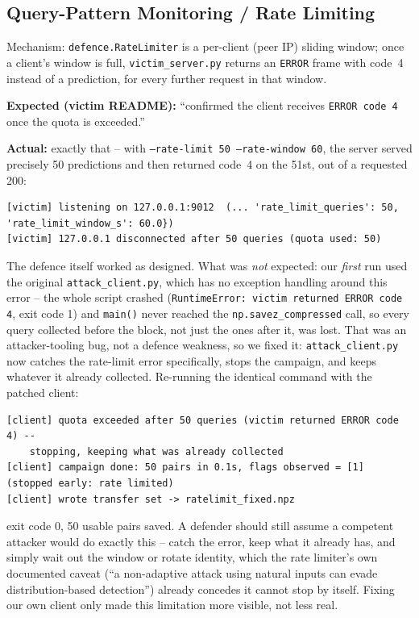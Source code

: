 \documentclass[11pt]{article}
\begin{document}
\subsection{Query-Pattern Monitoring / Rate Limiting}

Mechanism: \texttt{defence.RateLimiter} is a per-client (peer IP) sliding
window; once a client's window is full, \texttt{victim\_server.py} returns
an \texttt{ERROR} frame with code~4 instead of a prediction, for every
further request in that window.

\textbf{Expected (victim README):} ``confirmed the client receives
\texttt{ERROR code 4} once the quota is exceeded.''

\textbf{Actual:} exactly that -- with \texttt{--rate-limit 50 --rate-window 60},
the server served precisely 50 predictions and then returned code~4 on the
51st, out of a requested 200:
\begin{lstlisting}
[victim] listening on 127.0.0.1:9012  (... 'rate_limit_queries': 50, 'rate_limit_window_s': 60.0})
[victim] 127.0.0.1 disconnected after 50 queries (quota used: 50)
\end{lstlisting}
The defence itself worked as designed. What was \emph{not} expected: our
\emph{first} run used the original \texttt{attack\_client.py}, which has no
exception handling around this error -- the whole script crashed
(\texttt{RuntimeError: victim returned ERROR code 4}, exit code 1) and
\texttt{main()} never reached the \texttt{np.savez\_compressed} call, so
every query collected before the block, not just the ones after it, was
lost. That was an attacker-tooling bug, not a defence weakness, so we fixed
it: \texttt{attack\_client.py} now catches the rate-limit error specifically,
stops the campaign, and keeps whatever it already collected. Re-running the
identical command with the patched client:
\begin{lstlisting}
[client] quota exceeded after 50 queries (victim returned ERROR code 4) --
    stopping, keeping what was already collected
[client] campaign done: 50 pairs in 0.1s, flags observed = [1]  (stopped early: rate limited)
[client] wrote transfer set -> ratelimit_fixed.npz
\end{lstlisting}
exit code 0, 50 usable pairs saved. A defender should still assume a
competent attacker would do exactly this -- catch the error, keep what it
already has, and simply wait out the window or rotate identity, which the
rate limiter's own documented caveat (``a non-adaptive attack using natural
inputs can evade distribution-based detection'') already concedes it cannot
stop by itself. Fixing our own client only made this limitation more
visible, not less real.
\end{document}
